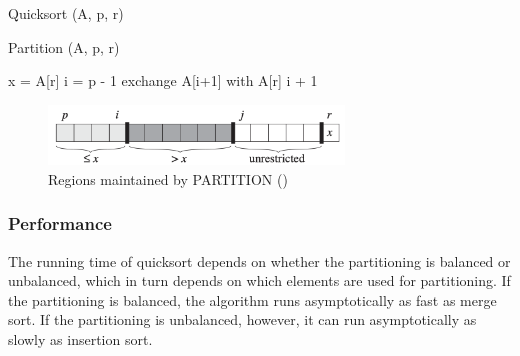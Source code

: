 \begin{algorithm}[H]
    \caption{Quicksort (A, p, r)}
\end{algorithm}

\begin{algorithm}[H]
    \caption{Partition (A, p, r)}
    x = A[r]\; 
    i = p - 1\;
    exchange A[i+1] with A[r]\;
    \Return i + 1\;
\end{algorithm}


\begin{figure}[H]
    \centering
    \includegraphics[width=0.7\textwidth]{assets/quicksort_areas.png}
    \caption{Regions maintained by PARTITION  (\cite{cormen2022introduction})}
\end{figure}

\subsubsection*{Performance}

The running time of quicksort depends on whether the partitioning is balanced or
unbalanced, which in turn depends on which elements are used for partitioning.
If the partitioning is balanced, the algorithm runs asymptotically as fast as merge
sort. If the partitioning is unbalanced, however, it can run asymptotically as slowly
as insertion sort.

